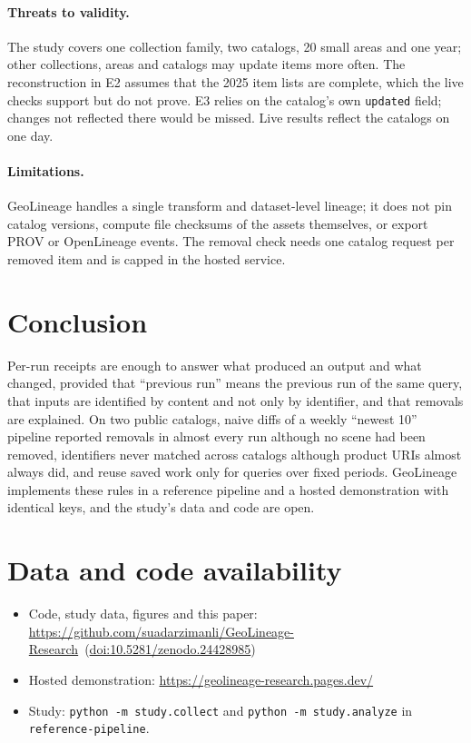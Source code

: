 \documentclass[11pt,a4paper]{article}
\newcommand{\repourl}{https://github.com/suadarzimanli/GeoLineage-Research}
\newcommand{\appurl}{https://geolineage-research.pages.dev/}
\newcommand{\archivedoi}{~(\href{https://doi.org/10.5281/zenodo.24428985}{doi:10.5281/zenodo.24428985})}
\begin{document}
\paragraph{Threats to validity.} The study covers one collection family, two catalogs, 20 small areas and one year; other collections, areas and catalogs may update items more often. The reconstruction in E2 assumes that the 2025 item lists are complete, which the live checks support but do not prove. E3 relies on the catalog's own \texttt{updated} field; changes not reflected there would be missed. Live results reflect the catalogs on one day.

\paragraph{Limitations.} GeoLineage handles a single transform and dataset-level lineage; it does not pin catalog versions, compute file checksums of the assets themselves, or export PROV or OpenLineage events. The removal check needs one catalog request per removed item and is capped in the hosted service.

\section{Conclusion}

Per-run receipts are enough to answer what produced an output and what changed, provided that ``previous run'' means the previous run of the same query, that inputs are identified by content and not only by identifier, and that removals are explained. On two public catalogs, naive diffs of a weekly ``newest 10'' pipeline reported removals in almost every run although no scene had been removed, identifiers never matched across catalogs although product URIs almost always did, and reuse saved work only for queries over fixed periods. GeoLineage implements these rules in a reference pipeline and a hosted demonstration with identical keys, and the study's data and code are open.

\section*{Data and code availability}
\begin{itemize}[leftmargin=1.2em]
  \item Code, study data, figures and this paper: \url{\repourl}\archivedoi
  \item Hosted demonstration: \url{\appurl}
  \item Study: \texttt{python -m study.collect} and \texttt{python -m study.analyze} in \texttt{reference-pipeline}.
\end{itemize}
\end{document}

